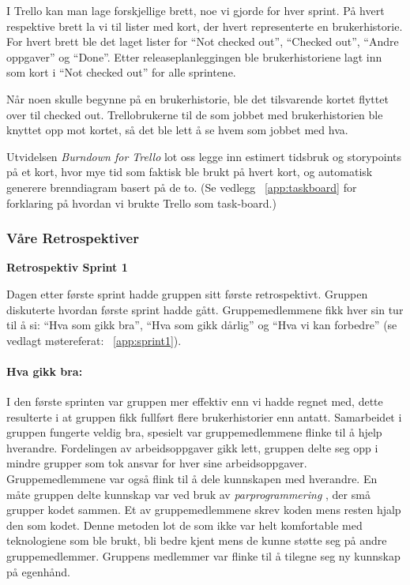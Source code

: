 \documentclass[12pt,a4paper,norsk]{article}
\begin{document}
    I Trello kan man lage forskjellige brett, noe vi gjorde for hver sprint. På hvert respektive brett la vi til lister med kort, der hvert representerte en brukerhistorie. For hvert brett ble det laget lister for “Not checked out”, “Checked out”, “Andre oppgaver” og “Done”. Etter releaseplanleggingen ble brukerhistoriene lagt inn som kort i “Not checked out” for alle sprintene.

    Når noen skulle begynne på en brukerhistorie, ble det tilsvarende kortet flyttet over til checked out. Trellobrukerne til de som jobbet med brukerhistorien ble knyttet opp mot kortet, så det ble lett å se hvem som jobbet med hva.

    Utvidelsen \textit{Burndown for Trello} lot oss legge inn estimert tidsbruk og storypoints på et kort, hvor mye tid som faktisk ble brukt på hvert kort, og automatisk generere brenndiagram basert på de to. (Se vedlegg ~\ref{app:taskboard} for forklaring på hvordan vi brukte Trello som task-board.)
  \subsubsection{Våre Retrospektiver}

\bigskip \noindent \textbf{Retrospektiv Sprint 1}
\par Dagen etter første sprint hadde gruppen sitt første retrospektivt. Gruppen  diskuterte hvordan første sprint hadde gått. Gruppemedlemmene fikk hver sin tur til å si: “Hva som gikk bra”, “Hva som gikk dårlig” og “Hva vi kan forbedre” (se vedlagt møtereferat: ~\cref{app:sprint1}).

\paragraph{Hva gikk bra:}
I den første sprinten var gruppen mer effektiv enn vi hadde regnet med, dette resulterte i at gruppen fikk fullført flere brukerhistorier enn antatt. Samarbeidet i gruppen fungerte veldig bra, spesielt var gruppemedlemmene flinke til å hjelp hverandre. Fordelingen av arbeidsoppgaver gikk lett, gruppen delte seg opp i mindre grupper som tok ansvar for hver sine arbeidsoppgaver. Gruppemedlemmene var også flink til å dele kunnskapen med hverandre. En måte gruppen delte kunnskap var ved bruk av \textit{parprogrammering} \cite[side 17]{dyba}, der små grupper kodet sammen. Et av gruppemedlemmene skrev koden mens resten hjalp den som kodet. Denne metoden lot de som ikke var helt komfortable med teknologiene som ble brukt, bli bedre kjent mens de kunne støtte seg på andre gruppemedlemmer. Gruppens medlemmer var flinke til å tilegne seg ny kunnskap på egenhånd.
\end{document}
